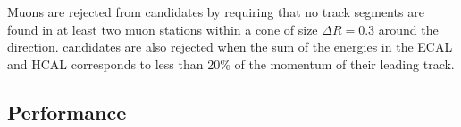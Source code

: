 Muons are rejected from \tauh candidates by requiring that no track segments are found in at least two muon stations within a cone of size $\Delta R = 0.3$ around the \tauh direction. \tauh candidates are also rejected when the sum of the energies in the ECAL and HCAL corresponds to less than 20\% of the momentum of their leading track.

\subsection{Performance}

